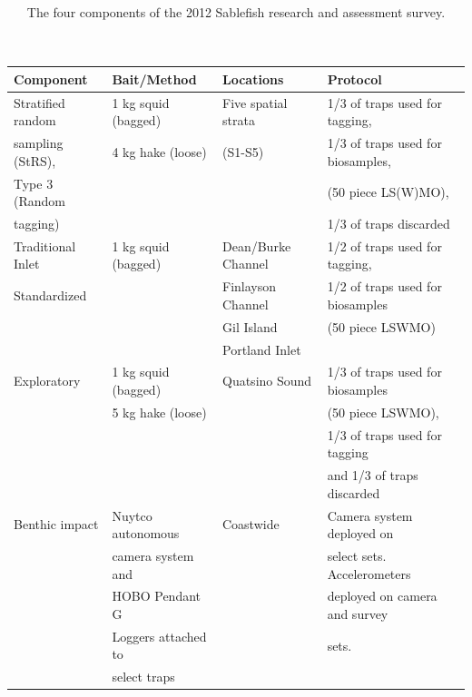 \documentclass[12pt]{article}\usepackage[]{graphicx}\usepackage[]{color}
\begin{document}
\begin{table}[!h]

\caption{\label{tab:table1}The four components of the 2012 Sablefish research and assessment survey.\\
\hspace*{0.333em}\\
\hspace*{0.333em}\\}
\fontsize{10}{12}\selectfont
\begin{tabular}[t]{llll}
\toprule
\textbf{Component} & \textbf{Bait/Method} & \textbf{Locations} & \textbf{Protocol}\\
\midrule
Stratified random & 1 kg squid (bagged) & Five spatial strata & 1/3 of traps used for tagging,\\
sampling (StRS), & 4 kg hake (loose) & (S1-S5) & 1/3 of traps used for biosamples,\\
Type 3 (Random &  &  & (50 piece LS(W)MO),\\
tagging) &  &  & 1/3 of traps discarded\\
\midrule
Traditional Inlet & 1 kg squid (bagged) & Dean/Burke Channel & 1/2 of traps used for tagging,\\
Standardized &  & Finlayson Channel & 1/2 of traps used for biosamples\\
 &  & Gil Island & (50 piece LSWMO)\\
 &  & Portland Inlet & \\
\midrule
Exploratory & 1 kg squid (bagged) & Quatsino Sound & 1/3 of traps used for biosamples\\
 & 5 kg hake (loose) &  & (50 piece LSWMO),\\
 &  &  & 1/3 of traps used for tagging\\
 &  &  & and 1/3 of traps discarded\\
\midrule
Benthic impact & Nuytco autonomous & Coastwide & Camera system deployed on\\
 & camera system and &  & select sets.  Accelerometers\\
 & HOBO Pendant G &  & deployed on camera and survey\\
 & Loggers attached to &  & sets.\\
 & select traps &  & \\
\bottomrule
\end{tabular}
\end{table}
~\\
\hspace*{0.333em}\\
\hspace*{0.333em}\\
\end{document}
